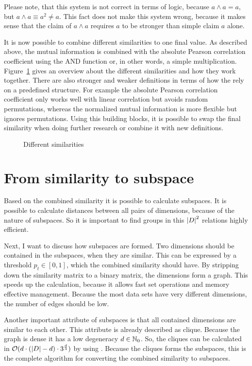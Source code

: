 Please note, that this system is not correct in terms of logic, because $a \wedge a = a$, but $a \wedge a \equiv a^2 \neq a$. This fact does not make this system wrong, because it makes sense that the claim of $a \wedge a$ requires $a$ to be stronger than simple claim $a$ alone.

It is now possible to combine different similarities to one final value. As described above, the mutual information is combined with the absolute Pearson correlation coefficient using the AND function or, in other words, a simple multiplication. Figure~\ref{fig:similarities} gives an overview about the different similarities and how they work together. There are also stronger and weaker definitions in terms of how the rely on a predefined structure. For example the absolute Pearson correlation coefficient only works well with linear correlation but avoids random permutations, whereas the normalized mutual information is more flexible but ignores permutations. Using this building blocks, it is possible to swap the final similarity when doing further research or combine it with new definitions.

\begin{figure}
	
	\caption{Different similarities}
	\label{fig:similarities}
\end{figure}

\section{From similarity to subspace}
Based on the combined similarity it is possible to calculate subspaces. It is possible to calculate distances between all pairs of dimensions, because of the nature of subspaces. So it is important to find groups in this $\left|D\right|^2$ relations highly efficient.

Next, I want to discuss how subspaces are formed. Two dimensions should be contained in the subspaces, when they are similar. This can be expressed by a threshold $p_t \in [0,1]$, which the combined similarity should have. By stripping down the similarity matrix to a binary matrix, the dimensions form a graph. This speeds up the calculation, because it allows fast set operations and memory effective management. Because the most data sets have very different dimensions, the number of edges should be low.

Another important attribute of subspaces is that all contained dimensions are similar to each other. This attribute is already described as clique. Because the graph is dense it has a low degeneracy $d \in \mathbb{N}_0$. So, the cliques can be calculated in $\mathcal{O}(d \cdot (\left|D\right| - d) \cdot 3^{\frac{d}{3}})$ by using \cite{listingCliques}. Because the cliques forms the subspaces, this is the complete algorithm for converting the combined similarity to subspaces.

